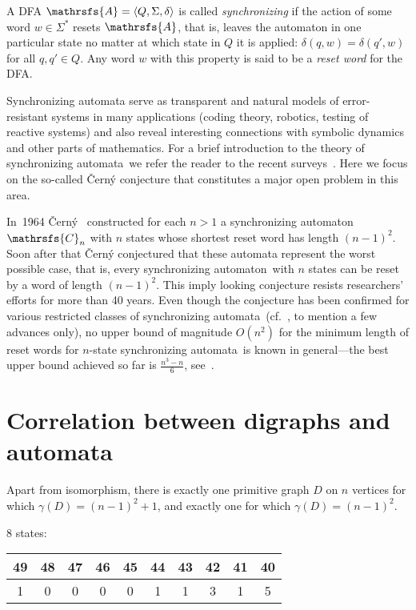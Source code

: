 \documentclass[11pt]{llncs}
\newcommand{\sa}{synchronizing automata}
\newcommand{\san}{synchronizing automaton}
\begin{document}
A DFA $\mathrsfs{A}=\langle Q,\Sigma,\delta\rangle$ is called
\emph{synchronizing} if the action of some word $w\in\Sigma^*$
resets $\mathrsfs{A}$, that is, leaves the automaton in one
particular state no matter at which state in $Q$ it is applied:
$\delta(q,w)=\delta(q',w)$ for all $q,q'\in Q$. Any word $w$
with this property is said to be a \emph{reset word} for the DFA.

Synchronizing automata serve as transparent and natural models of
error-resistant systems in many applications (coding theory, robotics,
testing of reactive systems) and also reveal interesting connections
with symbolic dynamics and other parts of mathematics. For a brief
introduction to the theory of \sa\ we refer the reader to the recent
surveys~\cite{Sa05,Vo08}. Here we focus on the so-called \v{C}ern\'{y}
conjecture that constitutes a major open problem in this area.

In~1964 \v{C}ern\'{y}~\cite{Ce64} constructed for each $n>1$ a \san\
$\mathrsfs{C}_n$ with $n$ states whose shortest reset word has length
$(n-1)^2$. Soon after that \v{C}ern\'{y} conjectured that these automata
represent the worst possible case, that is, every \san\ with $n$ states
can be reset by a word of length $(n-1)^2$. This imply looking conjecture
resists researchers' efforts for more than 40 years. Even though the
conjecture has been confirmed for various restricted classes of \sa\ (cf.\
\cite{Ep90,Du98,Ka03,Tr07,Vo09}, to mention a few advances only), no upper
bound of magnitude $O(n^2)$ for the minimum length of reset words for
$n$-state \sa\ is known in general---the best upper bound achieved so
far is $\frac{n^3-n}6$, see~\cite{Pi83}.



\section{Correlation between digraphs and automata}

\begin{theorem}\label{dulmage}
Apart from isomorphism, there is exactly one primitive graph $D$
on $n$ vertices for which $\gamma(D) = (n - 1)^2 + 1$, and exactly one
for which $\gamma(D) = (n - 1)^2$.
\end{theorem}

8 states:\\

\begin{tabular}{|c|c|c|c|c|c|c|c|c|c|}
49 & 48 & 47 & 46 & 45 & 44 & 43 & 42 & 41 & 40 \\
\hline
1  & 0  & 0  & 0  & 0  & 1  & 1  & 3  & 1  & 5  \\
\end{tabular}
\vspace{0.7cm}
\end{document}
